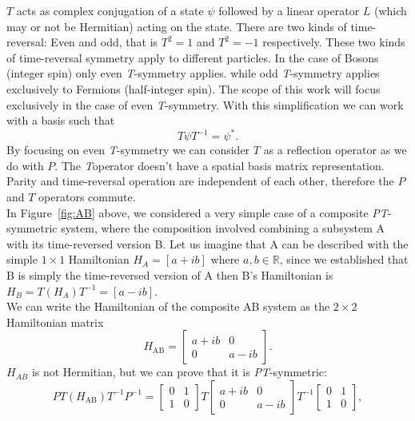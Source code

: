 \documentclass[10pt, a4paper, singlespacing]{report}
\newcommand\PT{\emph{PT}}
\newcommand\TT{\emph{T}}
\begin{document}
$T$ acts as complex conjugation of a state $\psi$ followed by a linear operator $L$ (which may or not be Hermitian) acting on the state. There are two kinds of time-reversal: Even and odd, that is $T^2 = 1$ and $T^2 = -1$ respectively. These two kinds of time-reversal symmetry apply to different particles. In the case of Bosons (integer spin) only even \TT-symmetry applies. while odd \TT-symmetry applies exclusively to Fermions (half-integer spin)\cite{Jones-Smith}.
The scope of this work will focus exclusively in the case of even \TT-symmetry. With this simplification we can work with a basis such that 
\begin{equation} \label{eq:4}
T \psi T^{-1} = \psi^{*}.
\end{equation}
By focusing on even \TT-symmetry we can consider $T$ as a reflection operator as we do with $P$. The \TT operator doesn't have a spatial basis matrix representation.\\
Parity and time-reversal operation are independent of each other, therefore the $P$ and $T$ operators commute\cite{BenderPT}.\\
In Figure~\ref{fig:AB} above, we considered a very simple case of a composite \PT-symmetric system, where the composition involved combining a subsystem A with its time-reversed version B.
Let us imagine that A can be described with the simple $1 \times 1 $ Hamiltonian $H_{A} = [a+ib]$ where $a, b \in \mathds{R}$, since we established that B is simply the time-reversed version of A then B's Hamiltonian is $H_{B} = T (H_{A}) T^{-1} = [a-ib]$.\\
We can write the Hamiltonian of the composite AB system as the $2 \times 2$ Hamiltonian matrix
\begin{equation} \label{eq:5}
H_{\mathrm{AB}} = \begin{bmatrix}
a+ib & 0 \\ 
0 & a-ib
\end{bmatrix}.
\end{equation}
$H_{AB}$ is not Hermitian, but we can prove that it is \PT-symmetric:
\begin{equation} \label{eq:6}
PT(H_{\mathrm{AB}})T^{-1}P^{-1} = \begin{bmatrix}
0 & 1 \\ 
1 & 0
\end{bmatrix}
T
\begin{bmatrix}
a+ib & 0 \\ 
0 & a-ib
\end{bmatrix}
T^{-1}
\begin{bmatrix}
0 & 1 \\ 
1 & 0
\end{bmatrix},
\end{equation}
\end{document}
